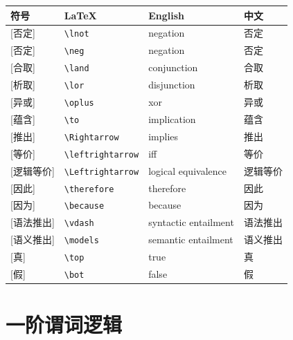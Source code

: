 \documentclass[11pt]{ctexart}
\begin{document}
\begin{longtable}{>{\centering\arraybackslash}m{2cm} m{3.5cm} m{4.5cm} m{4cm}}
\toprule
符号 & LaTeX & English & 中文 \\
\midrule
\syms{$\lnot$}{\verb|\lnot|}[否定] & \verb|\lnot| & negation & 否定 \\
\syms{$\neg$}{\verb|\neg|}[否定] & \verb|\neg| & negation & 否定 \\
\syms{$\land$}{\verb|\land|}[合取] & \verb|\land| & conjunction & 合取 \\
\syms{$\lor$}{\verb|\lor|}[析取] & \verb|\lor| & disjunction & 析取 \\
\syms{$\oplus$}{\verb|\oplus|}[异或] & \verb|\oplus| & xor & 异或 \\
\syms{$\to$}{\verb|\to|}[蕴含] & \verb|\to| & implication & 蕴含 \\
\syms{$\Rightarrow$}{\verb|\Rightarrow|}[推出] & \verb|\Rightarrow| & implies & 推出 \\
\syms{$\leftrightarrow$}{\verb|\leftrightarrow|}[等价] & \verb|\leftrightarrow| & iff & 等价 \\
\syms{$\Leftrightarrow$}{\verb|\Leftrightarrow|}[逻辑等价] & \verb|\Leftrightarrow| & logical equivalence & 逻辑等价 \\
\syms{$\therefore$}{\verb|\therefore|}[因此] & \verb|\therefore| & therefore & 因此 \\
\syms{$\because$}{\verb|\because|}[因为] & \verb|\because| & because & 因为 \\
\syms{$\vdash$}{\verb|\vdash|}[语法推出] & \verb|\vdash| & syntactic entailment & 语法推出 \\
\syms{$\models$}{\verb|\models|}[语义推出] & \verb|\models| & semantic entailment & 语义推出 \\
\syms{$\top$}{\verb|\top|}[真] & \verb|\top| & true & 真 \\
\syms{$\bot$}{\verb|\bot|}[假] & \verb|\bot| & false & 假 \\
\bottomrule
\end{longtable}

\section{一阶谓词逻辑}\label{sec:fopl}
\end{document}
